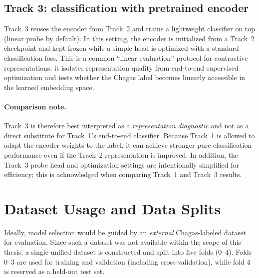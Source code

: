 \subsection{Track 3: classification with pretrained encoder}
Track~3 reuses the encoder from Track~2 and trains a lightweight classifier on top (linear probe by default).
In this setting, the encoder is initialized from a Track~2 checkpoint and kept frozen while a simple head is optimized with a standard classification loss.
This is a common ``linear evaluation'' protocol for contrastive representations: it isolates representation quality from end-to-end supervised optimization and tests whether the Chagas label becomes linearly accessible in the learned embedding space.

\paragraph{Comparison note.}
Track~3 is therefore best interpreted as a \emph{representation diagnostic} and not as a direct substitute for Track~1's end-to-end classifier.
Because Track~1 is allowed to adapt the encoder weights to the label, it can achieve stronger pure classification performance even if the Track~2 representation is improved.
In addition, the Track~3 probe head and optimization settings are intentionally simplified for efficiency; this is acknowledged when comparing Track~1 and Track~3 results.

\section{Dataset Usage and Data Splits}
Ideally, model selection would be guided by an \emph{external} Chagas-labeled dataset for evaluation.
Since such a dataset was not available within the scope of this thesis, a single unified dataset is constructed and split into five folds (0--4).
Folds 0--3 are used for training and validation (including cross-validation), while fold 4 is reserved as a held-out test set.

